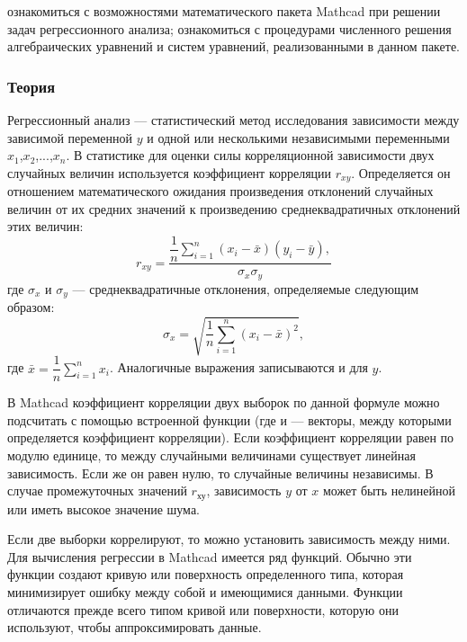 
\goal ознакомиться с возможностями математического пакета Mathcad при решении задач регрессионного анализа; ознакомиться с процедурами численного решения алгебраических уравнений и систем уравнений, реализованными в данном пакете. 

\subsubsection*{Теория}
Регрессионный анализ --- статистический метод исследования зависимости между зависимой переменной $y$ и одной или несколькими независимыми переменными $x_1$,$x_2$,...,$x_n$.
В статистике для оценки силы корреляционной зависимости двух случайных величин используется коэффициент корреляции $r_{xy}$. Определяется он отношением математического ожидания произведения отклонений случайных величин от их средних значений к произведению среднеквадратичных отклонений этих величин:
\begin{equation}
	r_{xy}=\dfrac{\dfrac{1}{n} \sum\limits_{i=1}^{n} (x_i-\bar{x}) (y_i-\bar{y}), }{\sigma_x \sigma_y}
\end{equation}
где $\sigma_x$ и $\sigma_y$ --- среднеквадратичные отклонения, определяемые следующим образом:
\begin{equation}
	\sigma_x=\sqrt{\dfrac{1}{n} \sum\limits_{i=1}^{n}(x_i-\bar{x})^2},
\end{equation}
где $\bar{x}=\dfrac{1}{n} \sum\limits_{i=1}^{n} x_i$.
Аналогичные выражения записываются и для $y$.

В Mathcad коэффициент корреляции двух выборок по данной формуле можно подсчитать с помощью встроенной функции  (где  и  --- векторы, между которыми определяется коэффициент корреляции). Если коэффициент корреляции равен по модулю единице, то между случайными величинами существует линейная зависимость. Если же он равен нулю, то случайные величины независимы. В случае промежуточных значений $r_{ху}$, зависимость $y$ от $x$ может быть нелинейной или иметь высокое значение шума.

Если две выборки коррелируют, то можно установить зависимость между ними. Для вычисления регрессии в Mathcad имеется ряд функций. Обычно эти функции создают кривую или поверхность определенного типа, которая минимизирует ошибку между собой и имеющимися данными. Функции отличаются прежде всего типом кривой или поверхности, которую они используют, чтобы аппроксимировать данные.

